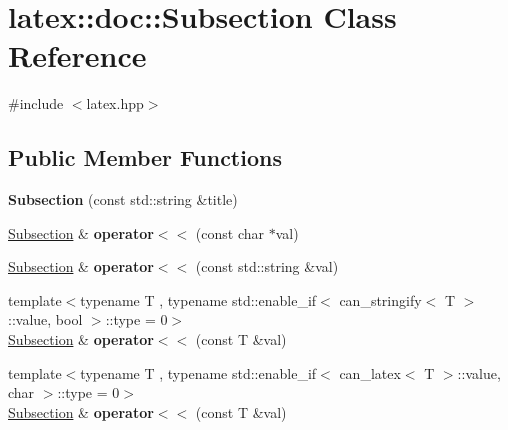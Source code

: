 \hypertarget{classlatex_1_1doc_1_1Subsection}{\section{latex\-:\-:doc\-:\-:Subsection Class Reference}
\label{classlatex_1_1doc_1_1Subsection}
}


{\ttfamily \#include $<$latex.\-hpp$>$}

\subsection*{Public Member Functions}
\begin{DoxyCompactItemize}
\item 
\hypertarget{classlatex_1_1doc_1_1Subsection_a58c86ee6e9d450b75d84a5c4e91ad54a}{{\bfseries Subsection} (const std\-::string \&title)}\label{classlatex_1_1doc_1_1Subsection_a58c86ee6e9d450b75d84a5c4e91ad54a}

\item 
\hypertarget{classlatex_1_1doc_1_1Subsection_a8c8a6a26148c2316ca8f512ae35ad8da}{\hyperlink{classlatex_1_1doc_1_1Subsection}{Subsection} \& {\bfseries operator$<$$<$} (const char $\ast$val)}\label{classlatex_1_1doc_1_1Subsection_a8c8a6a26148c2316ca8f512ae35ad8da}

\item 
\hypertarget{classlatex_1_1doc_1_1Subsection_a7efa65925d268faf43e353a52041e230}{\hyperlink{classlatex_1_1doc_1_1Subsection}{Subsection} \& {\bfseries operator$<$$<$} (const std\-::string \&val)}\label{classlatex_1_1doc_1_1Subsection_a7efa65925d268faf43e353a52041e230}

\item 
\hypertarget{classlatex_1_1doc_1_1Subsection_a5cd1f815a7e416bfb3f5f85b3d8fc09b}{{\footnotesize template$<$typename T , typename std\-::enable\-\_\-if$<$ can\-\_\-stringify$<$ T $>$\-::value, bool $>$\-::type  = 0$>$ }\\\hyperlink{classlatex_1_1doc_1_1Subsection}{Subsection} \& {\bfseries operator$<$$<$} (const T \&val)}\label{classlatex_1_1doc_1_1Subsection_a5cd1f815a7e416bfb3f5f85b3d8fc09b}

\item 
\hypertarget{classlatex_1_1doc_1_1Subsection_a5cd1f815a7e416bfb3f5f85b3d8fc09b}{{\footnotesize template$<$typename T , typename std\-::enable\-\_\-if$<$ can\-\_\-latex$<$ T $>$\-::value, char $>$\-::type  = 0$>$ }\\\hyperlink{classlatex_1_1doc_1_1Subsection}{Subsection} \& {\bfseries operator$<$$<$} (const T \&val)}\label{classlatex_1_1doc_1_1Subsection_a5cd1f815a7e416bfb3f5f85b3d8fc09b}

\end{DoxyCompactItemize}
